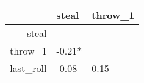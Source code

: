 \begin{table}[ht]
\centering
\begin{tabular}{rll}
  \hline
 & steal & throw\_1 \\ 
  \hline
steal &  &  \\ 
  throw\_1 & -0.21*    &  \\ 
  last\_roll & -0.08     &  0.15     \\ 
   \hline
\end{tabular}
\end{table}
